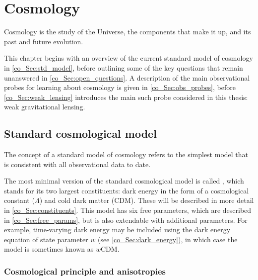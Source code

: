 
% 
% 

% 

\chapter{Cosmology}
\label{chap:cosmo}
\graphicspath{{../Figs/cosmo/}{Figs/cosmo/}}

Cosmology is the study of the Universe, the components that make it up, and its past and future evolution.

This chapter begins with an overview of the current standard model of cosmology in \autoref{co_Sec:std_model}, before outlining some of the key questions that remain unanswered in \autoref{co_Sec:open_questions}. A description of the main observational probes for learning about cosmology is given in \autoref{co_Sec:obs_probes}, before \autoref{co_Sec:weak_lensing} introduces the main such probe considered in this thesis: weak gravitational lensing.

\section{Standard cosmological model}
\label{co_Sec:std_model}

The concept of a standard model of cosmology refers to the simplest model that is consistent with all observational data to date.

The most minimal version of the standard cosmological model is called \lcdm{}, which stands for its two largest constituents: dark energy in the form of a cosmological constant ($\Lambda$) and cold dark matter (CDM). These will be described in more detail in \autoref{co_Sec:constituents}. This model has six free parameters, which are described in \autoref{co_Sec:free_params}, but is also extendable with additional parameters. For example, time-varying dark energy may be included using the dark energy equation of state parameter $w$ (see \autoref{co_Sec:dark_energy}), in which case the model is sometimes known as $w$CDM.

\subsection{Cosmological principle and anisotropies}

